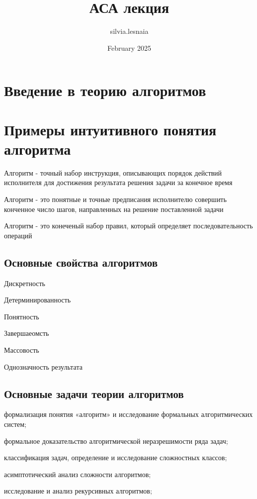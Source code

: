 \documentclass{article}
\title{АСА лекция}
\author{silvia.lesnaia }
\date{February 2025}
\begin{document}
\maketitle


\section{Введение в теорию алгоритмов}

\section{Примеры интуитивного понятия алгоритма}

Алгоритм - точный набор инструкция, описывающих порядок действий исполнителя для достижения результата решения задачи за конечное время

Алгоритм - это понятные и точные предписания исполнителю совершить конченное число шагов, направленных на решение поставленной задачи

Алгоритм - это конеченый набор правил, который определяет последовательность операций


\subsection{Основные свойства алгоритмов}

Дискретность

Детерминированность

Понятность

Завершаеомсть

Массовость

Однозначность результата 



\subsection{Основные задачи теории алгоритмов}

формализация понятия «алгоритм» и  исследование формальных алгоритмических систем;

формальное доказательство алгоритмической неразрешимости ряда задач;

классификация задач, определение и исследование сложностных классов;

асимптотический анализ сложности алгоритмов;

исследование и анализ рекурсивных алгоритмов;
\end{document}
